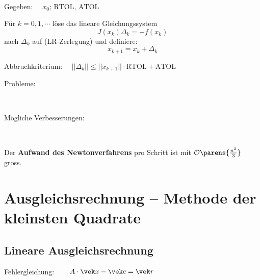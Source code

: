 			\begin{algo} ~
				
				Gegeben: $\quad x_0;\, \mathrm{RTOL},\, \mathrm{ATOL}$
				
				Für $k=0,1,\cdots$ löse das lineare Gleichungssystem
				\[
					J(x_k) \Delta_k = -f(x_k)
				\]
				nach $\Delta_k$ auf (LR-Zerlegung) und definiere:
				\[
					x_{k+1} = x_k + \Delta_k
				\]
				
				Abbruchkriterium: $\quad ||\Delta_k|| \leq ||x_{k+1}||\cdot \mathrm{RTOL} + \mathrm{ATOL}$
			\end{algo}
			
			\begin{description}
				\item[Probleme:] ~
				\item[Mögliche Verbesserungen:] ~
			\end{description}
			Der \textbf{Aufwand des Newtonverfahrens} pro Schritt ist mit $\mathcal{O}\parens{\frac{n^3}{3}}$ gross.

\section{Ausgleichsrechnung -- Methode der kleinsten Quadrate} 
	\subsection{Lineare Ausgleichsrechnung}
		Fehlergleichung: $\quad\ \:\: A\cdot \vek x - \vek c = \vek r$
		
